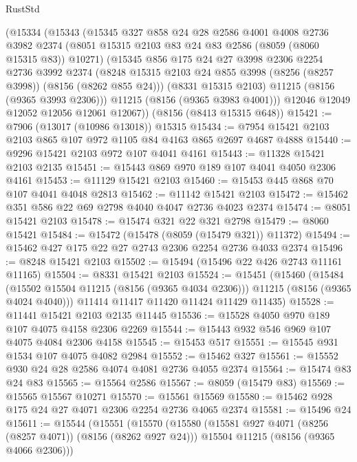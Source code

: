 \begin{lexlean}{RustStd}
\begin{coremodule}
{\begin{coremodule}
{{{{{{{{{{{{{{{{{{{{{{{{{{{{{{{{{{    (@15334
      (@15343
        (@15345
          @327
          @858
          @24
          @28
          @2586
          @4001
          @4008
          @2736
          @3982
          @2374
          (@8051 @15315 @2103 @83 @24 @83 @2586 (@8059 (@8060 @15315 @83)) @10271)
          (@15345
            @856
            @175
            @24
            @27
            @3998
            @2306
            @2254
            @2736
            @3992
            @2374
            (@8248 @15315 @2103 @24 @855 @3998 (@8256 (@8257 @3998)) (@8156 (@8262 @855 @24)))
            (@8331 @15315 @2103)
            @11215
            (@8156 (@9365 @3993 @2306)))
          @11215
          (@8156 (@9365 @3983 @4001)))
        @12046
        @12049
        @12052
        @12056
        @12061
        @12067))
    (@8156 (@8413 @15315 @648))
@15421 := @7906 (@13017 (@10986 @13018)) @15315
@15434 := @7954 @15421 @2103 @2103 @865 @107 @972 @1105 @84 @4163 @865 @2697 @4687 @4888
@15440 := @9296 @15421 @2103 @972 @107 @4041 @4161
@15443 := @11328 @15421 @2103 @2135
@15451 := @15443 @869 @970 @189 @107 @4041 @4050 @2306 @4161
@15453 := @11129 @15421 @2103
@15460 := @15453 @445 @868 @70 @107 @4041 @4048 @2813
@15462 := @11142 @15421 @2103
@15472 := @15462 @351 @586 @22 @69 @2798 @4040 @4047 @2736 @4023 @2374
@15474 := @8051 @15421 @2103
@15478 := @15474 @321 @22 @321 @2798
@15479 := @8060 @15421
@15484 := @15472 (@15478 (@8059 (@15479 @321)) @11372)
@15494 := @15462 @427 @175 @22 @27 @2743 @2306 @2254 @2736 @4033 @2374
@15496 := @8248 @15421 @2103
@15502 := @15494 (@15496 @22 @426 @2743 @11161 @11165)
@15504 := @8331 @15421 @2103
@15524 := @15451
    (@15460
      (@15484 (@15502 @15504 @11215 (@8156 (@9365 @4034 @2306))) @11215 (@8156 (@9365 @4024 @4040)))
      @11414
      @11417
      @11420
      @11424
      @11429
      @11435)
@15528 := @11441 @15421 @2103 @2135 @11445
@15536 := @15528 @4050 @970 @189 @107 @4075 @4158 @2306 @2269
@15544 := @15443 @932 @546 @969 @107 @4075 @4084 @2306 @4158
@15545 := @15453 @517
@15551 := @15545 @931 @1534 @107 @4075 @4082 @2984
@15552 := @15462 @327
@15561 := @15552 @930 @24 @28 @2586 @4074 @4081 @2736 @4055 @2374
@15564 := @15474 @83 @24 @83
@15565 := @15564 @2586
@15567 := @8059 (@15479 @83)
@15569 := @15565 @15567 @10271
@15570 := @15561 @15569
@15580 := @15462 @928 @175 @24 @27 @4071 @2306 @2254 @2736 @4065 @2374
@15581 := @15496 @24
@15611 := @15544
    (@15551
      (@15570
        (@15580
          (@15581 @927 @4071 (@8256 (@8257 @4071)) (@8156 (@8262 @927 @24)))
          @15504
          @11215
          (@8156 (@9365 @4066 @2306)))
}}}}}}}}}}}}}}}}}}}}}}}}}}}}}}}}}}
\end{coremodule}}
\end{coremodule}
\end{lexlean}
